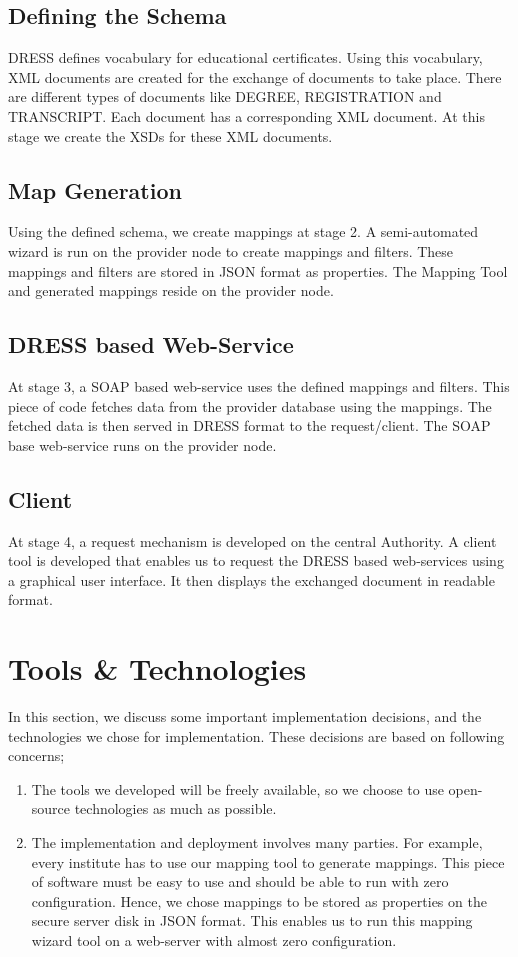 \documentclass[12pt,a4paper,oneside]{book}
\begin{document}
\subsection{Defining the Schema}
DRESS defines vocabulary for educational certificates. Using this vocabulary, XML documents are created for the exchange of documents to take place. There are different types of documents like DEGREE, REGISTRATION and TRANSCRIPT. Each document has a corresponding XML document. At this stage we create the XSDs for these XML documents.

\subsection{Map Generation}
Using the defined schema, we create mappings at stage 2. A semi-automated wizard is run on the provider node to create mappings and filters. These mappings and filters are stored in JSON format as properties.  The Mapping Tool and generated mappings reside on the provider node.

\subsection{DRESS based Web-Service}
At stage 3, a SOAP based web-service uses the defined mappings and filters. This piece of code fetches data from the provider database using the mappings. The fetched data is then served in DRESS format to the  request/client. The SOAP base web-service runs on the provider node. 

\subsection{Client}
At stage 4, a request mechanism is developed on the central Authority. A client tool is developed that enables us to request the DRESS based web-services using a graphical user interface. It then displays the exchanged document in readable format.

\section{Tools \& Technologies}
In this section, we discuss some important implementation decisions, and the technologies we chose for implementation. These decisions are based on following concerns;

\begin{enumerate}

\item The tools we developed will be freely available, so we choose to use open-source technologies as much as possible.

\item The implementation and deployment involves many parties. For example, every institute has to use our mapping tool to generate mappings. This piece of software must be easy to use and should be able to run with zero configuration. Hence, we chose mappings to be stored as properties on the secure server disk in JSON format. This enables us to run this mapping wizard tool on a web-server with almost zero configuration.	

\end{enumerate}
\end{document}
